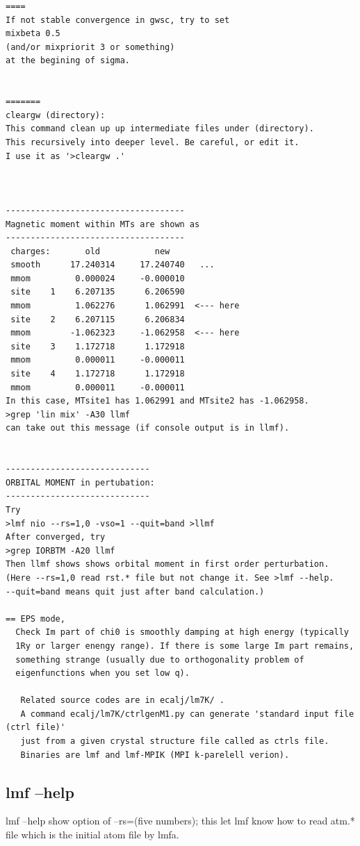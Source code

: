 \documentclass[a4paper,10pt,epsf,fleqn]{article}
\begin{document}
{\begin{verbatim}
====
If not stable convergence in gwsc, try to set
mixbeta 0.5
(and/or mixpriorit 3 or something)
at the begining of sigma.


=======
cleargw (directory):
This command clean up up intermediate files under (directory).
This recursively into deeper level. Be careful, or edit it.
I use it as '>cleargw .'



------------------------------------
Magnetic moment within MTs are shown as
------------------------------------
 charges:       old           new     
 smooth      17.240314     17.240740   ...
 mmom         0.000024     -0.000010   
 site    1    6.207135      6.206590  
 mmom         1.062276      1.062991  <--- here
 site    2    6.207115      6.206834  
 mmom        -1.062323     -1.062958  <--- here
 site    3    1.172718      1.172918  
 mmom         0.000011     -0.000011  
 site    4    1.172718      1.172918  
 mmom         0.000011     -0.000011  
In this case, MTsite1 has 1.062991 and MTsite2 has -1.062958.
>grep 'lin mix' -A30 llmf 
can take out this message (if console output is in llmf).


-----------------------------
ORBITAL MOMENT in pertubation:
-----------------------------
Try 
>lmf nio --rs=1,0 -vso=1 --quit=band >llmf
After converged, try
>grep IORBTM -A20 llmf
Then llmf shows shows orbital moment in first order perturbation.
(Here --rs=1,0 read rst.* file but not change it. See >lmf --help.
--quit=band means quit just after band calculation.)

== EPS mode,
  Check Im part of chi0 is smoothly damping at high energy (typically
  1Ry or larger enengy range). If there is some large Im part remains,
  something strange (usually due to orthogonality problem of
  eigenfunctions when you set low q).

   Related source codes are in ecalj/lm7K/ .
   A command ecalj/lm7K/ctrlgenM1.py can generate 'standard input file (ctrl file)' 
   just from a given crystal structure file called as ctrls file. 
   Binaries are lmf and lmf-MPIK (MPI k-parelell verion).

\end{verbatim}


\subsection{lmf --help}
lmf --help show option of --rs=(five numbers); this let lmf know 
how to read atm.* file which is the initial atom file by lmfa.


}
\end{document}
